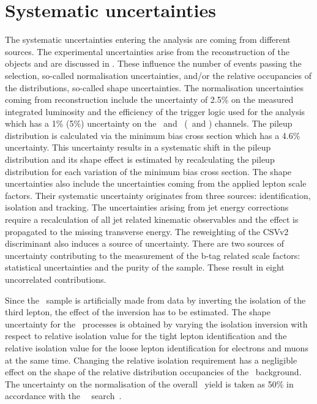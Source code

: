 \newpage
\section{Systematic uncertainties}
\label{sec:sys}
The systematic uncertainties entering the analysis are coming from different sources. The experimental uncertainties arise from the reconstruction of the objects and are discussed in . These influence the number of events passing the selection, so-called normalisation uncertainties, and/or the relative occupancies of the distributions, so-called shape
 uncertainties. The normalisation uncertainties coming from reconstruction include the uncertainty of 2.5\% on the measured integrated luminosity and the efficiency of the trigger logic used for the analysis which has a 1\% (5\%) uncertainty on the 
 \mumumu\ and \emumu\ (\eemu\ and \eee) channels. The  pileup distribution is calculated via the minimum bias cross section which has a 4.6\% uncertainty. This uncertainty results in a systematic shift in the pileup distribution and its shape effect is estimated by recalculating the pileup distribution for each variation of the minimum bias cross section. The shape uncertainties also include the uncertainties coming from the applied lepton scale factors. Their systematic uncertainty originates from three sources: identification, isolation and tracking.  The uncertainties arising from jet energy corrections require a recalculation of all jet related kinematic observables and the effect is propagated to the missing transverse energy.  The reweighting of the CSVv2 discriminant also induces a source of uncertainty. There are two sources of uncertainty contributing to the measurement of the b-tag related scale factors: statistical uncertainties and the purity of the sample. These result in eight uncorrelated contributions. 
 
 Since the \NPL\ sample is artificially made from data by inverting the isolation of the third lepton, the effect of the inversion has to be estimated. The shape uncertainty for the \NPL\ processes is obtained by varying the isolation inversion with respect to relative isolation value for the tight lepton identification and the relative isolation value for  the loose lepton identification for electrons and muons at the same time. Changing the relative isolation requirement has a negligible effect on the shape of the relative distribution occupancies of the \NPL\ background. The uncertainty on the normalisation of the overall \NPL\ yield is taken as 50\% in accordance with the \SM\ \tZq\ search~\cite{CMS-PAS-TOP-16-020}.
 
